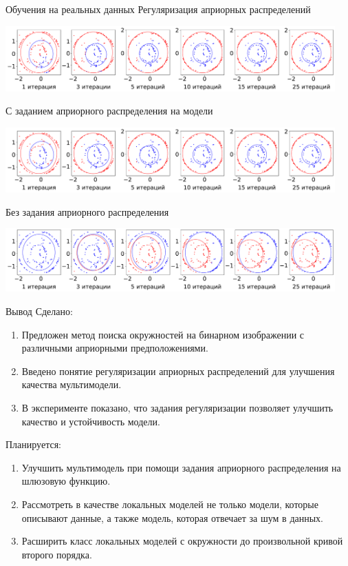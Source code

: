 \documentclass[9pt,pdf,hyperref={unicode}]{beamer}
\begin{document}
\begin{frame}{Обучения на реальных данных}
\justifying
Регуляризация априорных распределений
\begin{center}
	\includegraphics[width=0.95\textwidth]{result/experiment_real_regular}
\end{center}
С заданием априорного распределения на модели
\begin{center}
	\includegraphics[width=0.95\textwidth]{result/experiment_real_prior}
\end{center}
Без задания априорного распределения
\begin{center}
	\includegraphics[width=0.95\textwidth]{result/experiment_real_not_prior}
\end{center}
\end{frame}
\begin{frame}{Вывод}
\justifying
Сделано:
	\begin{enumerate}
	\justifying
		\item Предложен метод поиска окружностей на бинарном изображении с различными априорными предположениями.
		\item Введено понятие регуляризации априорных распределений для улучшения качества мультимодели.
		\item В эксперименте показано, что задания регуляризации позволяет улучшить качество и устойчивость модели.
	\end{enumerate}

Планируется:
	\begin{enumerate}
	\justifying
		\item Улучшить мультимодель при помощи задания априорного распределения на шлюзовую функцию.
		\item Рассмотреть в качестве локальных моделей не только модели, которые описывают данные, а также модель, которая отвечает за шум в данных.
		\item Расширить класс локальных моделей с окружности до произвольной кривой второго порядка.
	\end{enumerate}	

\end{frame}
\end{document}
